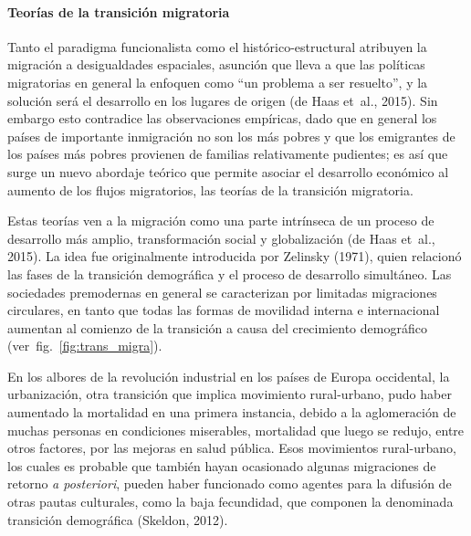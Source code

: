 \documentclass[12pt,spanish,]{article}
\let\oldparagraph\paragraph
\renewcommand{\paragraph}[1]{\oldparagraph{#1}\mbox{}}
\begin{document}
\hypertarget{teoruxedas-de-la-transiciuxf3n-migratoria}{%
\paragraph{Teorías de la transición
migratoria}\label{teoruxedas-de-la-transiciuxf3n-migratoria}}

Tanto el paradigma funcionalista como el histórico-estructural atribuyen
la migración a desigualdades espaciales, asunción que lleva a que las
políticas migratorias en general la enfoquen como ``un problema a ser
resuelto'', y la solución será el desarrollo en los lugares de origen
(de Haas et~al., 2015). Sin embargo esto contradice las observaciones
empíricas, dado que en general los países de importante inmigración no
son los más pobres y que los emigrantes de los países más pobres
provienen de familias relativamente pudientes; es así que surge un nuevo
abordaje teórico que permite asociar el desarrollo económico al aumento
de los flujos migratorios, las teorías de la transición migratoria.

Estas teorías ven a la migración como una parte intrínseca de un proceso
de desarrollo más amplio, transformación social y globalización (de Haas
et~al., 2015). La idea fue originalmente introducida por Zelinsky
(1971), quien relacionó las fases de la transición demográfica y el
proceso de desarrollo simultáneo. Las sociedades premodernas en general
se caracterizan por limitadas migraciones circulares, en tanto que todas
las formas de movilidad interna e internacional aumentan al comienzo de
la transición a causa del crecimiento demográfico
(ver~fig.~\ref{fig:trans_migra}).

En los albores de la revolución industrial en los países de Europa
occidental, la urbanización, otra transición que implica movimiento
rural-urbano, pudo haber aumentado la mortalidad en una primera
instancia, debido a la aglomeración de muchas personas en condiciones
miserables, mortalidad que luego se redujo, entre otros factores, por
las mejoras en salud pública. Esos movimientos rural-urbano, los cuales
es probable que también hayan ocasionado algunas migraciones de retorno
\emph{a posteriori}, pueden haber funcionado como agentes para la
difusión de otras pautas culturales, como la baja fecundidad, que
componen la denominada transición demográfica (Skeldon, 2012).
\end{document}
